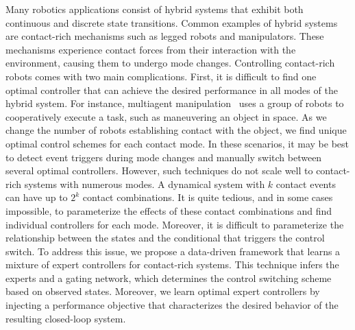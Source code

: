 

Many robotics applications consist of hybrid systems that exhibit both
continuous and discrete state transitions. Common examples of hybrid systems are
contact-rich mechanisms such as legged robots and manipulators. These mechanisms
experience contact forces from their interaction with the environment, causing
them to undergo mode changes. Controlling contact-rich robots comes with two
main complications. First, it is difficult to find one optimal controller that
can achieve the desired performance in all modes of the hybrid system.
%
For instance, multiagent manipulation~\cite{ashenafi2021nonholonomic} uses a
group of robots to cooperatively execute a task, such as maneuvering an object in
space.
%
As we change the number of robots establishing contact with the object, we find
unique optimal control schemes for each contact mode.
%
In these scenarios, it may be best to detect event triggers during mode changes and
manually switch between several optimal controllers.
%
However, such techniques do not scale well to contact-rich systems with numerous
modes. A dynamical system with $k$ contact events can have up to $2^k$ contact
combinations. It is quite tedious, and in some cases impossible, to parameterize
the effects of these contact combinations and find individual controllers for
each mode. Moreover, it is difficult to parameterize the relationship between
the states and the conditional that triggers the control switch. 
%
To address this issue, we propose a data-driven framework that
learns a mixture of expert controllers for contact-rich systems.
%
This technique infers the experts and a gating network, which determines the
control switching scheme based on observed states.
%
Moreover, we learn optimal expert controllers by injecting a performance
objective that characterizes the desired behavior of the resulting closed-loop
system.


